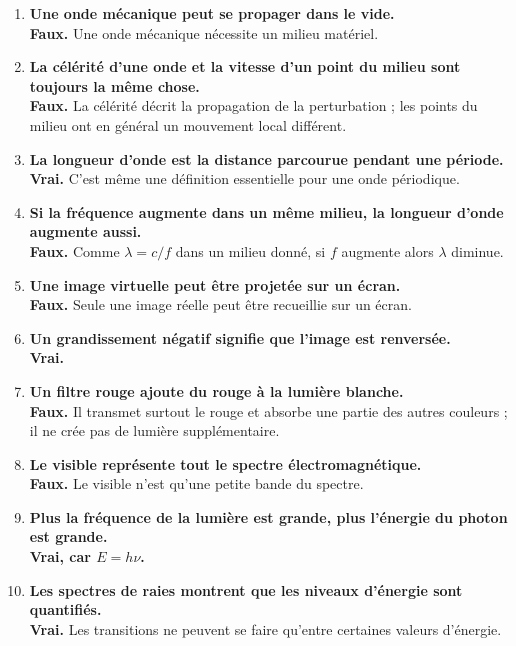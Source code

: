 \documentclass[11pt,a4paper]{article}
\begin{document}
\begin{enumerate}[label=\textbf{\arabic*.}]
    \item \textbf{Une onde mécanique peut se propager dans le vide.} \\
    \textbf{Faux.} Une onde mécanique nécessite un milieu matériel.

    \item \textbf{La célérité d'une onde et la vitesse d'un point du milieu sont toujours la même chose.} \\
    \textbf{Faux.} La célérité décrit la propagation de la perturbation ; les points du milieu ont en général un mouvement local différent.

    \item \textbf{La longueur d'onde est la distance parcourue pendant une période.} \\
    \textbf{Vrai.} C'est même une définition essentielle pour une onde périodique.

    \item \textbf{Si la fréquence augmente dans un même milieu, la longueur d'onde augmente aussi.} \\
    \textbf{Faux.} Comme $\lambda=c/f$ dans un milieu donné, si $f$ augmente alors $\lambda$ diminue.

    \item \textbf{Une image virtuelle peut être projetée sur un écran.} \\
    \textbf{Faux.} Seule une image réelle peut être recueillie sur un écran.

    \item \textbf{Un grandissement négatif signifie que l'image est renversée.} \\
    \textbf{Vrai.}

    \item \textbf{Un filtre rouge ajoute du rouge à la lumière blanche.} \\
    \textbf{Faux.} Il transmet surtout le rouge et absorbe une partie des autres couleurs ; il ne crée pas de lumière supplémentaire.

    \item \textbf{Le visible représente tout le spectre électromagnétique.} \\
    \textbf{Faux.} Le visible n'est qu'une petite bande du spectre.

    \item \textbf{Plus la fréquence de la lumière est grande, plus l'énergie du photon est grande.} \\
    \textbf{Vrai, car $E=h\nu$.}

    \item \textbf{Les spectres de raies montrent que les niveaux d'énergie sont quantifiés.} \\
    \textbf{Vrai.} Les transitions ne peuvent se faire qu'entre certaines valeurs d'énergie.
\end{enumerate}
\end{document}
